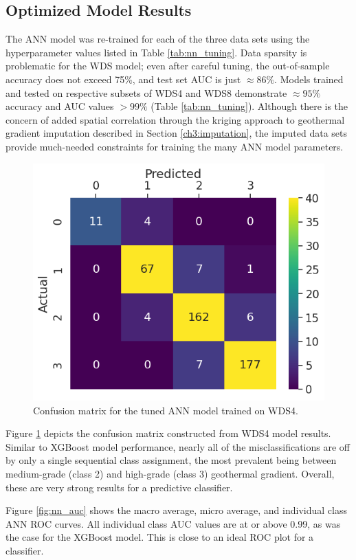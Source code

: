 \subsection{Optimized Model Results}\label{ch5:nn_final_results}

The ANN model was re-trained for each of the three data sets using the hyperparameter values listed in Table \ref{tab:nn_tuning}. Data sparsity is problematic for the WDS model; even after careful tuning, the out-of-sample accuracy does not exceed 75\%, and test set AUC is just $\approx86\%$. Models trained and tested on respective subsets of WDS4 and WDS8 demonstrate $\approx95\%$ accuracy and AUC values $>99\%$ (Table \ref{tab:nn_tuning}). Although there is the concern of added spatial correlation through the kriging approach to geothermal gradient imputation described in Section \ref{ch3:imputation}, the imputed data sets provide much-needed constraints for training the many ANN model parameters. 
 
\begin{figure}[htp]
\centering
\includegraphics[width=.5\textwidth]{templates/images/Figure-NN-ConfusionMatrix_WDS4.png}
\singlespacing
\caption[Neural network confusion matrix]{Confusion matrix for the tuned ANN model trained on WDS4.}
\label{fig:nn_confusion_matrix}
\end{figure}

Figure \ref{fig:nn_confusion_matrix} depicts the confusion matrix constructed from WDS4 model results. Similar to XGBoost model performance, nearly all of the misclassifications are off by only a single sequential class assignment, the most prevalent being between medium-grade (class 2) and high-grade (class 3) geothermal gradient. Overall, these are very strong results for a predictive classifier.

Figure \ref{fig:nn_auc} shows the macro average, micro average, and individual class ANN ROC curves. All individual class AUC values are at or above 0.99, as was the case for the XGBoost model. This is close to an ideal ROC plot for a classifier.

